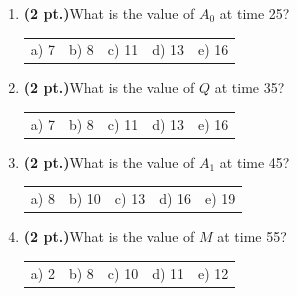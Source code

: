 \documentclass{article}
\begin{document}
\begin{enumerate}
\item {\bf (2 pt.)}What is the value of $A_0$ at time 25?

\begin{tabular}{p{0.6in} p{0.6in} p{0.6in} p{0.6in} l}
a) 7 & b) 8 & c) 11 & d) 13 & e) 16
\end{tabular}

\item {\bf (2 pt.)}What is the value of $Q$ at time 35?

\begin{tabular}{p{0.6in} p{0.6in} p{0.6in} p{0.6in} l}
a) 7 & b) 8 & c) 11 & d) 13 & e) 16
\end{tabular}

\item {\bf (2 pt.)}What is the value of $A_1$ at time 45?

\begin{tabular}{p{0.6in} p{0.6in} p{0.6in} p{0.6in} l}
a) 8 & b) 10 & c) 13 & d) 16 & e) 19
\end{tabular}

\item {\bf (2 pt.)}What is the value of $M$ at time 55?

\begin{tabular}{p{0.6in} p{0.6in} p{0.6in} p{0.6in} l}
a) 2 & b) 8 & c) 10 & d) 11 & e) 12
\end{tabular}

\end{enumerate}
\end{document}
